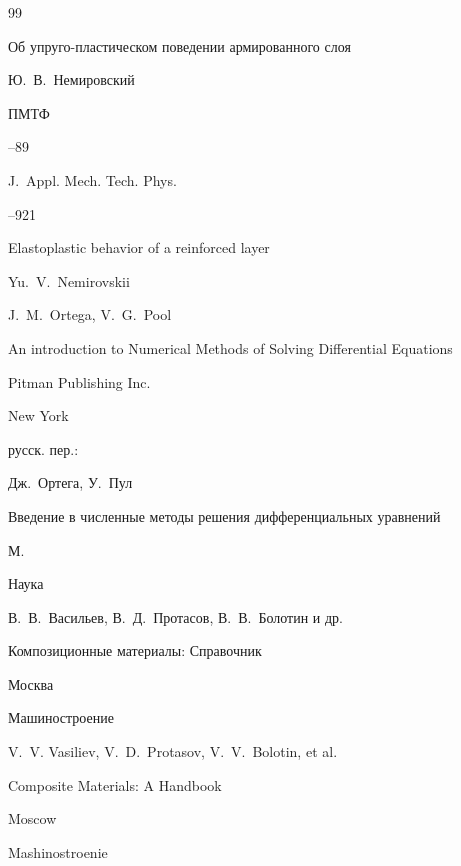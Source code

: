 \begin{thebibliography}{99}

\paper Об упруго-пластическом поведении армированного слоя

\by Ю.~В.~Немировский

\jour ПМТФ




--89

\misctransl

\jour J.~Appl. Mech. Tech. Phys.




--921

\paper Elastoplastic behavior of a reinforced layer

\by Yu.~V.~Nemirovskii 









\by J.~M.~Ortega, V.~G.~Pool

\book An introduction to Numerical Methods of Solving Differential Equations 

\publ Pitman Publishing Inc.

\publaddr New York


\rtransl русск. пер.:~

\by Дж.~Ортега, У.~Пул

\book Введение в численные методы решения дифференциальных уравнений

\publaddr М.

\publ Наука








\by В.~В.~Васильев, В.~Д.~Протасов, В.~В.~Болотин и др.

\book Композиционные материалы: Справочник

\publaddr Москва

\publ Машиностроение



\misctransl

\by V.~V. Vasiliev, V.~D.~Protasov, V.~V.~Bolotin, et al.

\book Composite Materials: A Handbook 

\publaddr Moscow 


\publ Mashinostroenie






\end{thebibliography}



